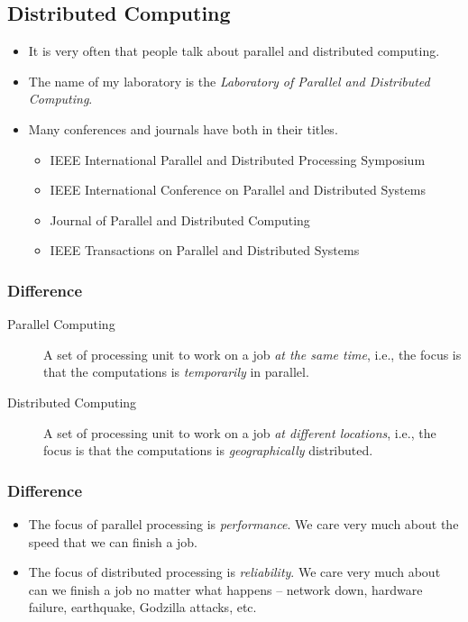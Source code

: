 \documentclass{beamer}
\begin{document}
\begin{CJK}{UTF8}{bsmi}
  \section{Distributed Computing}

  \begin{frame}
    \begin{itemize}
    \item It is very often that people talk about parallel and distributed
      computing.
    \item The name of my laboratory is the {\em Laboratory of Parallel and Distributed Computing}.
    \item Many conferences and journals have both in their titles.
      \begin{itemize}
      \item IEEE International Parallel and Distributed Processing Symposium
      \item IEEE International Conference on Parallel and Distributed Systems
      \item Journal of Parallel and Distributed Computing
      \item IEEE Transactions on Parallel and Distributed Systems
      \end{itemize}
    \end{itemize}
  \end{frame}

  \begin{frame}
    \frametitle{Difference}
    \begin{description}
    \item[Parallel Computing] A set of processing unit to work on a job
      {\em at the same time}, i.e., the focus is that the computations is
      {\em temporarily} in parallel.
    \item[Distributed Computing] A set of processing unit to work on a job
      {\em at different locations}, i.e., the focus is that the
      computations is {\em geographically} distributed.
    \end{description}
  \end{frame}

  \begin{frame}
    \frametitle{Difference}
    \begin{itemize}
    \item The focus of parallel processing is {\em performance}. 
      We care very much about the speed that we can finish a job.
    \item The focus of distributed processing is {\em reliability}. We care very much about can we finish a job no matter what happens -- network down, hardware failure, earthquake, Godzilla attacks, etc.
    \end{itemize}
  \end{frame}


\end{CJK}
\end{document}
